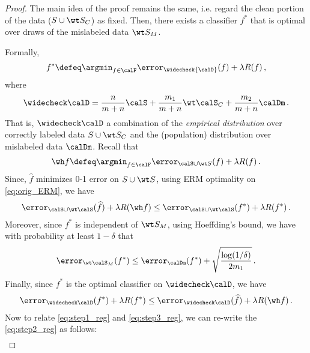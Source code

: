 \begin{proof}
    The main idea of the proof remains the same, i.e. regard 
    the clean portion of the data 
    ($S \cup \wt S_C$) as fixed.   
    Then, there exists a classifier $f^*$ 
    that is optimal over draws 
    of the mislabeled data $\wt S_M$. 

    
    Formally, 
    \begin{align}
    f^* \defeq \argmin_{f \in \calF} \error_{\widecheck {\calD}} (f)  + \lambda R(f) \,, \label{eq:modified_ERM_reg}
    \end{align}
    where $$\widecheck \calD = \frac{n}{m+n} \calS + \frac{m_1}{m+n} \wt \calS_C  + \frac{m_2}{m+n}\calDm \,.$$ That is, $\widecheck \calD$ a combination of 
    the \emph{empirical distribution} 
    over correctly labeled data $S \cup \wt S_C$
    and the (population) distribution 
    over mislabeled data $\calDm$.
    Recall that 
    \begin{align}
    \wh f \defeq \argmin_{f \in \calF} \error_{\calS \cup \wt S} (f) + \lambda R(f) \,. \label{eq:orig_ERM_reg}
    \end{align}
    Since, $\widehat f$ minimizes 0-1 error 
    on $S \cup \wt S$, using ERM optimality on \eqref{eq:orig_ERM},  
    we have 
    \begin{align}
        \error_{\calS \cup \wt \calS}(\widehat f) + \lambda R(\wh f) \le \error_{
            \calS \cup \wt \calS}(f^*) + \lambda R(f^*) \,.    \label{eq:step1_reg}
    \end{align}
    Moreover, since $f^*$ is independent of $\wt S_M$, using Hoeffding's bound,
    we have with probability at least $1-\delta$ that
    \begin{align}
      \error_{\wt \calS_M}(f^*) \le \error_{ \calDm}(f^*) +  \sqrt{\frac{\log(1/\delta)}{2 m_1}} \,. \label{eq:step2_reg} 
    \end{align}
    Finally, since $f^*$ is the optimal classifier on $\widecheck \calD$, 
    we have 
    \begin{align}
        \error_{\widecheck \calD}(f^*) + \lambda R(f^*) \le \error_{\widecheck \calD}(\widehat f) + \lambda R(\wh f) \,. \label{eq:step3_reg}
    \end{align}
     Now to relate \eqref{eq:step1_reg} and \eqref{eq:step3_reg}, we can re-write the \eqref{eq:step2_reg} as follows: 
    \begin{align}

\end{align}
\end{proof}
